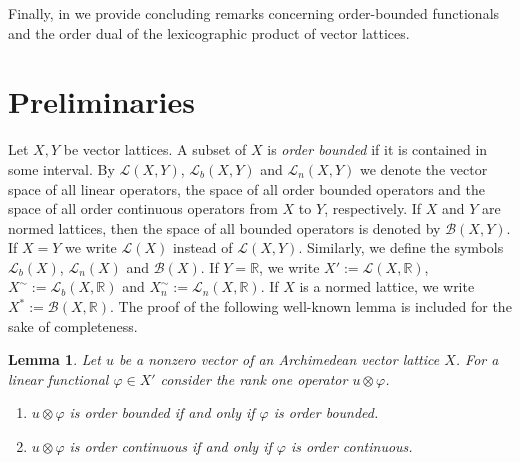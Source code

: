 \documentclass[12pt,reqno]{amsart}
\theoremstyle{plain}
\newtheorem{lemma}[theorem]{Lemma}
\theoremstyle{definition}
\begin{document}
Finally, in  we provide concluding remarks concerning order-bounded functionals and the order dual of the lexicographic product of vector lattices.
  

\section{Preliminaries}\label{preliminaries}

Let $X,Y$ be vector lattices. A subset of $X$ is \emph{order bounded} if it is contained in some interval. 
By $\mathscr L(X,Y)$, $\mathscr L_b(X,Y)$ and $\mathscr L_n(X,Y)$ we denote the vector space of all linear operators, the space of all order bounded operators and  the space of all order continuous operators from $X$ to $Y$, respectively. If $X$ and $Y$ are normed lattices, then the space of all bounded operators is denoted by $\mathscr B(X,Y)$. If $X=Y$ we write $\mathscr L(X)$ instead of $\mathscr L(X,Y)$. Similarly, we define the symbols $\mathscr L_b(X)$, $\mathscr L_n(X)$ and $\mathscr B(X)$.
If $Y=\mathbb R$, we write 
$X':=\mathscr L(X,\mathbb R)$, $X^\sim:=\mathscr L_b(X,\mathbb R)$ and $X_n^\sim:=\mathscr L_n(X,\mathbb R)$. If $X$ is a normed lattice, we write $X^*:=\mathscr B(X,\mathbb R)$. The proof of the following well-known lemma is included for the sake of completeness.  

\begin{lemma}\label{order bounded operator functional}
Let $u$ be a nonzero vector of an Archimedean vector lattice $X$. For a linear functional $\varphi \in X'$ consider the rank one operator $u\otimes \varphi$.
 \begin{enumerate}
 \item $u\otimes \varphi$ is order bounded if and only if $\varphi$ is order bounded.
 \item $u\otimes \varphi$ is order continuous if and only if $\varphi$ is order continuous.
 \end{enumerate}
\end{lemma}
\end{document}
